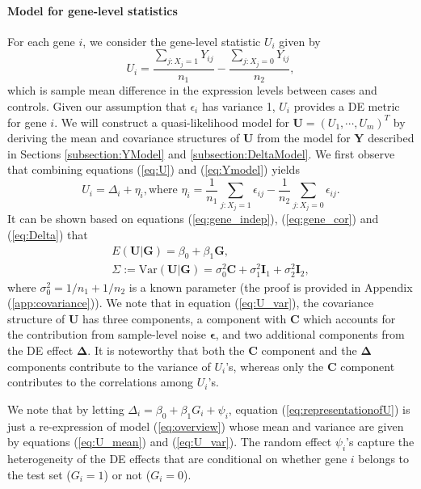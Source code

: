 	\paragraph{Model for gene-level statistics}\label{subsection:UModel}
	For each gene $i$, we consider the gene-level statistic $U_i$ given by 
	\begin{equation}
	\label{eq:U}
	U_i = \dfrac{\sum_{j: X_j=1}Y_{ij}}{n_1} - \dfrac{\sum_{j: X_j=0}Y_{ij}}{n_2},
	\end{equation}
	which is sample mean difference in the expression levels between cases and controls. Given our
	assumption that $\epsilon_i$ has variance 1, $U_i$ provides a DE metric for gene $i$. We will
	construct a quasi-likelihood model for $\bm U=(U_1,\cdots,U_m)^T$ by deriving the mean and
	covariance structures of $\bm U$ from the model for $\bm Y$ described in Sections
	\ref{subsection:YModel} and \ref{subsection:DeltaModel}. We first observe that combining 
	equations (\ref{eq:U}) and (\ref{eq:Ymodel}) yields
	\begin{equation}\label{eq:representationofU}
	U_i = \Delta_i + \eta_i, \text{where } \eta_i = \dfrac{1}{n_1}\sum_{j: X_j=1}\epsilon_{ij}-
	\dfrac{1}{n_2}\sum_{j: X_j=0}\epsilon_{ij}.
	\end{equation}
	It can be shown based on equations (\ref{eq:gene_indep}), (\ref{eq:gene_cor}) and 
	(\ref{eq:Delta}) that
	\begin{gather}
	E(\bm U|\bm G) = \beta_0+\beta_1 \bm G,\label{eq:U_mean}\\
	\Sigma:=\mbox{Var}(\bm U|\bm G) = \sigma_0^2\bm C + \sigma_1^2\bm I_1+\sigma_2^2\bm
	I_2,\label{eq:U_var}
	\end{gather}
	where $\sigma_0^2=1/n_1+1/n_2$ is a known parameter (the proof is provided in Appendix 
	(\ref{app:covariance})). We note that in equation (\ref{eq:U_var}), the	covariance structure of 
	$\bm U$ has three components, a component with $\bm C$ which accounts for the contribution from 
	sample-level noise $\bm \epsilon$, and two additional components from the DE effect $\bm 
	\Delta$. It is noteworthy that both the $\bm C$ component and the $\bm \Delta$ components 
	contribute to the variance of $U_i$'s, whereas only the $\bm C$ component contributes to
	the correlations among $U_i$'s.
	
	We note that by letting $\Delta_i = \beta_0 + \beta_1 G_i + \psi_i$, equation 
	(\ref{eq:representationofU}) is just a re-expression of model (\ref{eq:overview}) whose mean 
	and variance are given by equations (\ref{eq:U_mean}) and (\ref{eq:U_var}). The random effect 
	$\psi_i$'s capture the heterogeneity of the DE effects that are conditional on whether gene $i$ 
	belongs to the test set ($G_i=1$) or not ($G_i= 0$).
	
